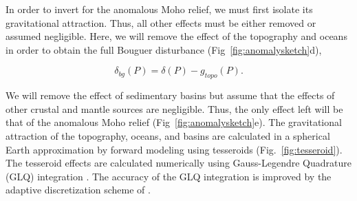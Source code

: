 \documentclass[extra]{gji}
\begin{document}
In order to invert for the anomalous Moho relief,
we must first isolate its gravitational attraction.
Thus, all other effects
must be either removed or assumed negligible.
Here, we will remove the effect of the topography and oceans
in order to obtain the full Bouguer disturbance
(Fig~\ref{fig:anomalysketch}d),

\begin{equation}
    \delta_{bg}(P) = \delta(P) - g_{topo}(P).
    \label{eq:bouguer}
\end{equation}

\noindent
We will remove the effect of sedimentary basins
but assume that the effects of
other crustal and mantle sources are negligible.
Thus, the only effect left will be that of the anomalous Moho relief
(Fig~\ref{fig:anomalysketch}e).
The gravitational attraction of the topography, oceans, and basins are
calculated in a spherical Earth approximation by forward modeling using
tesseroids (Fig.~\ref{fig:tesseroid}).
The tesseroid effects are calculated numerically using
Gauss-Legendre Quadrature (GLQ) integration \citep{asgharzadeh2007}.
The accuracy of the GLQ integration is improved by the adaptive discretization
scheme of \citet{uieda2016}.
\end{document}
